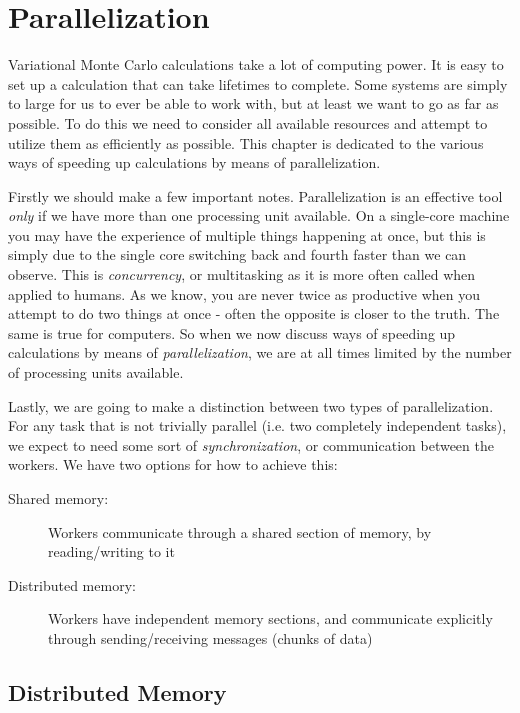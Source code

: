 \documentclass[Thesis.tex]{subfiles}
\begin{document}
\chapter{Parallelization}
\label{chp:parallelization}

Variational Monte Carlo calculations take a lot of computing power. It is easy
to set up a calculation that can take lifetimes to complete. Some systems are
simply to large for us to ever be able to work with, but at least we want to go
as far as possible. To do this we need to consider all available resources and
attempt to utilize them as efficiently as possible. This chapter is dedicated to
the various ways of speeding up calculations by means of parallelization.

Firstly we should make a few important notes. Parallelization is an effective
tool \emph{only} if we have more than one processing unit available. On a
single-core machine you may have the experience of multiple things
happening at once, but this is simply due to the single core switching back and
fourth faster than we can observe. This is \emph{concurrency}, or multitasking
as it is more often called when applied to humans. As we know, you are never
twice as productive when you attempt to do two things at once - often the
opposite is closer to the truth. The same is true for computers. So when we now
discuss ways of speeding up calculations by means of \emph{parallelization}, we are
at all times limited by the number of processing units available.

Lastly, we are going to make a distinction between two types of parallelization.
For any task that is not trivially parallel (i.e. two completely independent
tasks), we expect to need some sort of \emph{synchronization}, or communication
between the workers. We have two options for how to achieve this:

\begin{description}
\item[Shared memory:] Workers communicate through a shared section of memory, by
  reading/writing to it
  \item[Distributed memory:] Workers have independent memory sections, and
    communicate explicitly through sending/receiving messages (chunks of data)
\end{description}

\section{Distributed Memory}
\end{document}
